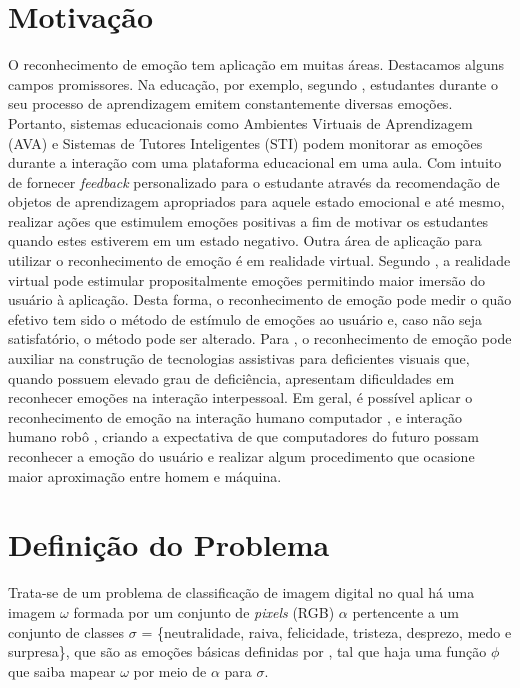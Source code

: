 \section{Motivação}
O reconhecimento de emoção tem aplicação em muitas áreas. Destacamos alguns campos promissores. Na educação, por exemplo, segundo \cite{jaques2013ambientes}, estudantes durante o seu processo de aprendizagem emitem constantemente diversas emoções. Portanto, sistemas educacionais como Ambientes Virtuais de Aprendizagem (AVA) e Sistemas de Tutores Inteligentes (STI) podem monitorar as emoções durante a interação com uma plataforma educacional em uma aula. Com intuito de fornecer \textit{feedback} personalizado para o estudante através da recomendação de objetos de aprendizagem apropriados para aquele estado emocional e até mesmo, realizar ações que estimulem emoções positivas a fim de motivar os estudantes quando estes estiverem em um estado negativo. Outra área de aplicação para utilizar o reconhecimento de emoção é em realidade virtual. Segundo \cite{riva2007affective}, a realidade virtual pode estimular propositalmente emoções permitindo maior imersão do usuário à aplicação. Desta forma, o reconhecimento de emoção pode medir o quão efetivo tem sido o método de estímulo de emoções ao usuário e, caso não seja satisfatório, o método pode ser alterado. Para \cite{li2015deep}, o reconhecimento de emoção pode auxiliar na construção de tecnologias assistivas para deficientes visuais que, quando possuem elevado grau de deficiência, apresentam dificuldades em reconhecer emoções na interação interpessoal. Em geral, é possível aplicar o reconhecimento de emoção na interação humano computador \citep{chen2017convolution,wen2017ensemble,liu2016facial, barsoum2016training}, e interação humano robô \citep{shin2016baseline,jung2015development}, criando a expectativa de que computadores do futuro possam reconhecer a emoção do usuário e realizar algum procedimento que ocasione maior aproximação entre homem e máquina.    

\section{Definição do Problema}\label{sec:problema}
Trata-se de um problema de classificação de imagem digital no qual há uma imagem $\omega$ formada por um conjunto de \textit{pixels} (RGB) $\alpha$ pertencente a um conjunto de classes $\sigma$ = \{neutralidade, raiva, felicidade, tristeza, desprezo, medo e surpresa\}, que são as emoções básicas definidas por \citep{ekman1994}, tal que haja uma função $\phi$ que saiba mapear $\omega$ por meio de $\alpha$ para $\sigma$.  

